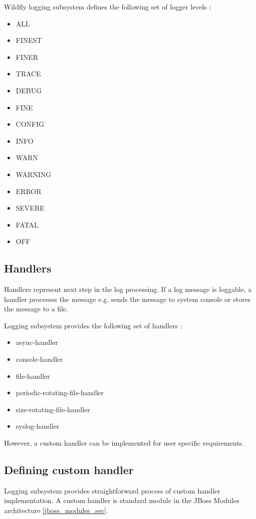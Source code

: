 \documentclass[12pt,oneside]{fithesis2}
\begin{document}
Wildfly logging subsystem defines the following set of logger levels \cite[Logging Configuration]{wildfly_doc}:

\begin{multicols}{2}
	\begin{itemize}
		\item ALL
		\item FINEST
		\item FINER
		\item TRACE
		\item DEBUG
		\item FINE
		\item CONFIG
		\item INFO
		\item WARN
		\item WARNING
		\item ERROR
		\item SEVERE
		\item FATAL
		\item OFF
	\end{itemize}
\end{multicols}

\subsection{Handlers}
\label{handlers}
Handlers represent next step in the log processing. If a log message is loggable, a handler processes the message e.g. sends the message to system console or stores the message to a file.

Logging subsystem provides the following set of handlers \cite[Logging Configuration]{wildfly_doc}:
\begin{itemize}
	\item async-handler
	\item console-handler
	\item file-handler
	\item periodic-rotating-file-handler
	\item size-rotating-file-handler
	\item syslog-handler
\end{itemize}
\noindent
However, a custom handler can be implemented for user specific requirements.

\subsection{Defining custom handler}
\label{custom_handler}
Logging subsystem provides straightforward process of custom handler implementation. A custom handler is standard module in the JBoss Modules architecture \ref{jboss_modules_sec}.
\end{document}

